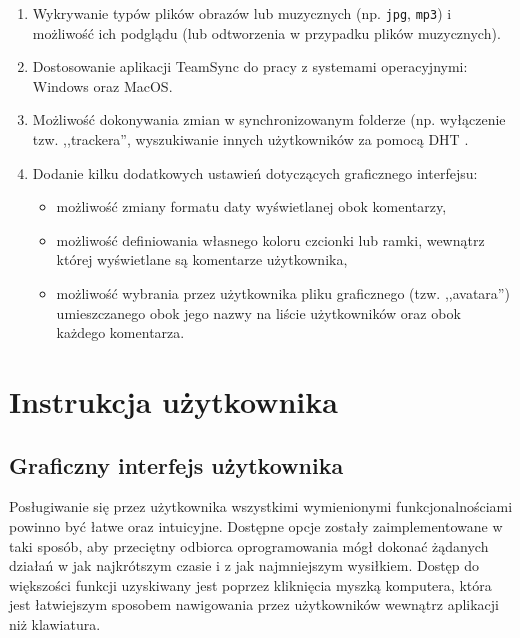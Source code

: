 \documentclass[polish,a4paper,twoside]{ppfcmthesis}
\begin{document}
\begin{enumerate}[noitemsep]
  \item Wykrywanie typów plików obrazów lub muzycznych (np. \texttt{jpg}, \texttt{mp3}) i możliwość ich podglądu (lub odtworzenia w przypadku plików muzycznych).
  
  \item Dostosowanie aplikacji TeamSync do pracy z systemami operacyjnymi: Windows oraz MacOS.
  
  \item Możliwość dokonywania zmian w synchronizowanym folderze (np. wyłączenie tzw. ,,trackera'', wyszukiwanie innych użytkowników za pomocą DHT \cite{dht}.
  
  \item Dodanie kilku dodatkowych ustawień dotyczących graficznego interfejsu:
  \begin{itemize}[noitemsep]
    \item możliwość zmiany formatu daty wyświetlanej obok komentarzy,
    \item możliwość definiowania własnego koloru czcionki lub ramki, wewnątrz której wyświetlane są komentarze użytkownika,
    \item możliwość wybrania przez użytkownika pliku graficznego (tzw. ,,avatara'') umieszczanego obok jego nazwy na liście użytkowników oraz obok każdego komentarza.
  \end{itemize}
\end{enumerate}

\cleardoublepage\appendix%
\chapter{Instrukcja użytkownika}

\section{Graficzny interfejs użytkownika}

\label{gui}

Posługiwanie się przez użytkownika wszystkimi wymienionymi funkcjonalnościami powinno być łatwe oraz intuicyjne. Dostępne opcje zostały zaimplementowane w taki sposób, aby przeciętny odbiorca oprogramowania mógł dokonać żądanych działań w jak najkrótszym czasie i z jak najmniejszym wysiłkiem. Dostęp do większości funkcji uzyskiwany jest poprzez kliknięcia myszką komputera, która jest łatwiejszym sposobem nawigowania przez użytkowników wewnątrz aplikacji niż klawiatura.
\end{document}
